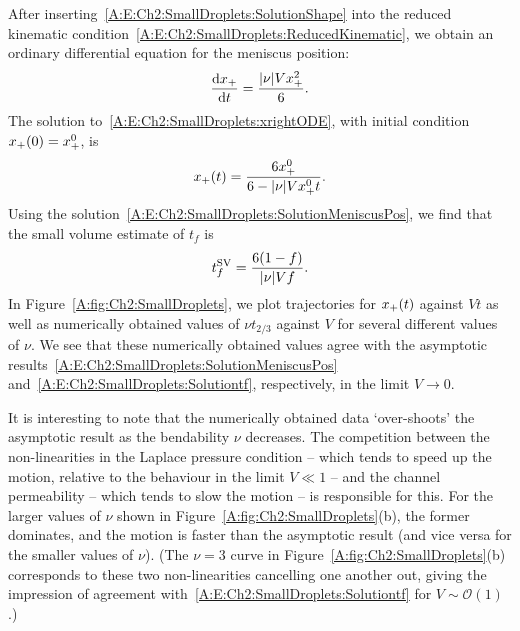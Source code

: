 \begin{subappendices}
After inserting~\eqref{A:E:Ch2:SmallDroplets:SolutionShape} into the reduced kinematic condition~\eqref{A:E:Ch2:SmallDroplets:ReducedKinematic}, we obtain an ordinary differential equation for the meniscus position:
\begin{equation}\label{A:E:Ch2:SmallDroplets:xrightODE}
\frac{\mathrm{d} x_{+}}{\mathrm{d} t} = \frac{|\nu| V x_{+}^2}{6}.
\end{equation}
The solution to~\eqref{A:E:Ch2:SmallDroplets:xrightODE}, with initial condition $x_{+}(0) = x_{+}^0$, is
\begin{equation}\label{A:E:Ch2:SmallDroplets:SolutionMeniscusPos}
x_{+}(t) = \frac{6x_{+}^0}{6 - |\nu| V x_{+}^0 t}.
\end{equation}
Using the solution~\eqref{A:E:Ch2:SmallDroplets:SolutionMeniscusPos}, we find that the small volume estimate of $t_f$ is
\begin{equation}\label{A:E:Ch2:SmallDroplets:Solutiontf}
t_f^{\text{SV}}= \frac{6(1-f)}{|\nu|V f}.
\end{equation}
In Figure~\ref{A:fig:Ch2:SmallDroplets}, we plot trajectories for $x_{+}(t)$ against $Vt$ as well as numerically obtained values of $\nu t_{2/3}$ against $V$ for several different values of $\nu$. We see that these numerically obtained values agree with the asymptotic results~\eqref{A:E:Ch2:SmallDroplets:SolutionMeniscusPos} and~\eqref{A:E:Ch2:SmallDroplets:Solutiontf}, respectively, in the limit $V \to 0$.

It is interesting to note that the numerically obtained data `over-shoots' the asymptotic result as the bendability $\nu$ decreases. The competition between the non-linearities in the Laplace pressure condition -- which tends to speed up the motion, relative to the behaviour in the limit $V \ll 1$ --  and the channel permeability -- which tends to slow the motion -- is responsible for this. For the larger values of $\nu$ shown in Figure~\ref{A:fig:Ch2:SmallDroplets}(b), the former dominates, and the motion is faster than the asymptotic result (and vice versa for the smaller values of $\nu$). (The $\nu = 3$ curve in Figure~\ref{A:fig:Ch2:SmallDroplets}(b) corresponds to these two non-linearities cancelling one another out, giving the impression of agreement with~\eqref{A:E:Ch2:SmallDroplets:Solutiontf} for $V\sim \mathcal{O}(1)$.)


\end{subappendices}
